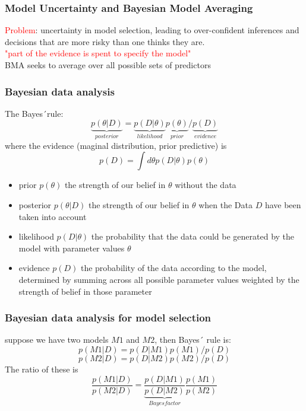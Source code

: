 \documentclass[hyperref={pdfpagelabels=true}]{beamer}
\begin{document}
\begin{frame}
\frametitle{Model Uncertainty and Bayesian Model Averaging}
\textcolor{red}{Problem}: uncertainty in model selection, leading to over-confident inferences
and decisions that are more risky than one thinks they are.\\
\vspace{0.5cm}
\textcolor{red}{"part of the evidence is spent to specify the model"}
\vspace{0.5cm}\\
BMA seeks to average over all possible sets of predictors
\end{frame}


\begin{frame}
\frametitle{Bayesian data analysis}
The Bayes´rule:
\[
\underbrace{p(\theta|D)}_{posterior}
=
\underbrace{p(D|\theta)}_{likelihood}
\underbrace{p(\theta)}_{prior}
/
\underbrace{p(D)}_{evidence} 
\]
where the evidence (maginal distribution, prior predictive) is
\[
p(D) = \int d\theta p(D|\theta)p(\theta)
\]
\begin{itemize}
\item prior $p(\theta)$ the strength of our belief in $\theta$ without the data
\item posterior $p(\theta|D)$ the strength of our belief in $\theta$ when the Data $D$ have been taken into account
\item likelihood $p(D|\theta)$ the probability that the data could be generated by the model with parameter values $\theta$
\item evidence $p(D)$ the probability of the data according to the model, determined by summing across all possible parameter values weighted by the strength of belief in those parameter
\end{itemize}
\end{frame}


\begin{frame}
\frametitle{Bayesian data analysis for model selection}
suppose we have two models $M1$ and $M2$, then Bayes´ rule is:
\[
p(M1|D) = p(D|M1)p(M1)/p(D) 
\]
\[
p(M2|D) = p(D|M2)p(M2)/p(D)
\]
The ratio of these is
\[
\frac{p(M1|D)}{p(M2|D)} = 
\underbrace{\frac{p(D|M1)}{p(D|M2)}}_{Bayes factor}
\frac{p(M1)}{p(M2)}
\]
\end{frame}
\end{document}
